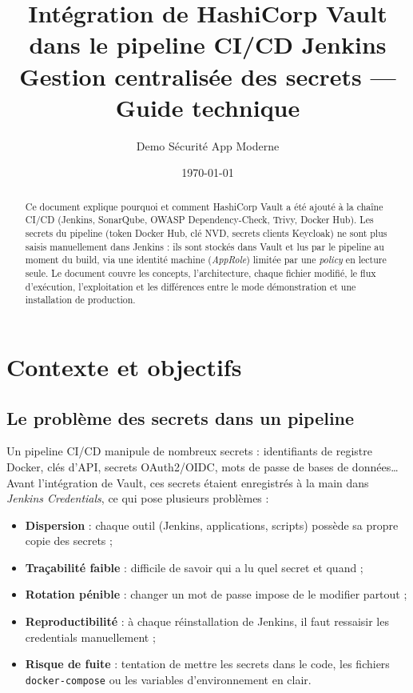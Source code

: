 \documentclass[11pt,a4paper]{article}
\title{\textbf{Intégration de HashiCorp Vault\\dans le pipeline CI/CD Jenkins}\\[0.4em]
       \large Gestion centralisée des secrets — Guide technique}
\author{Demo Sécurité App Moderne}
\date{\today}
\begin{document}
\maketitle
\thispagestyle{empty}

\begin{abstract}
Ce document explique pourquoi et comment HashiCorp Vault a été ajouté à la chaîne
CI/CD (Jenkins, SonarQube, OWASP Dependency-Check, Trivy, Docker Hub). Les secrets du
pipeline (token Docker Hub, clé NVD, secrets clients Keycloak) ne sont plus saisis
manuellement dans Jenkins : ils sont stockés dans Vault et lus par le pipeline au
moment du build, via une identité machine (\emph{AppRole}) limitée par une
\emph{policy} en lecture seule. Le document couvre les concepts, l'architecture, chaque
fichier modifié, le flux d'exécution, l'exploitation et les différences entre le mode
démonstration et une installation de production.
\end{abstract}

\tableofcontents
\newpage

\section{Contexte et objectifs}

\subsection{Le problème des secrets dans un pipeline}

Un pipeline CI/CD manipule de nombreux secrets : identifiants de registre Docker,
clés d'API, secrets OAuth2/OIDC, mots de passe de bases de données\ldots{} Avant
l'intégration de Vault, ces secrets étaient enregistrés à la main dans
\emph{Jenkins Credentials}, ce qui pose plusieurs problèmes :

\begin{itemize}[leftmargin=*]
  \item \textbf{Dispersion} : chaque outil (Jenkins, applications, scripts) possède sa
        propre copie des secrets ;
  \item \textbf{Traçabilité faible} : difficile de savoir qui a lu quel secret et quand ;
  \item \textbf{Rotation pénible} : changer un mot de passe impose de le modifier partout ;
  \item \textbf{Reproductibilité} : à chaque réinstallation de Jenkins, il faut ressaisir
        les credentials manuellement ;
  \item \textbf{Risque de fuite} : tentation de mettre les secrets dans le code, les
        fichiers \texttt{docker-compose} ou les variables d'environnement en clair.
\end{itemize}
\end{document}
